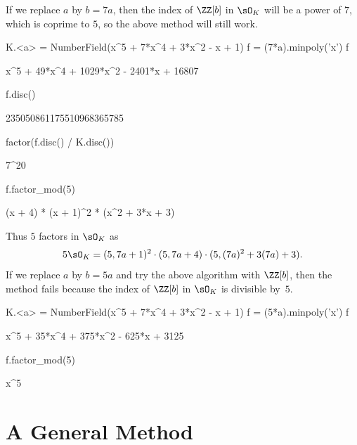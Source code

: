 If we replace $a$ by $b = 7a$, then the index of $\ZZ[b]$
in $\sO_K$ will be a power of $7$, which is coprime to $5$,
so the above method will still work.
\begin{sagecode}
\begin{sagecell}
K.<a> = NumberField(x^5 + 7*x^4 + 3*x^2 - x + 1)
f = (7*a).minpoly('x')
f
\end{sagecell}
\begin{sageout}
x^5 + 49*x^4 + 1029*x^2 - 2401*x + 16807
\end{sageout}
\begin{sagecell}
f.disc()
\end{sagecell}
\begin{sageout}
235050861175510968365785
\end{sageout}
\begin{sagecell}
factor(f.disc() / K.disc())
\end{sagecell}
\begin{sageout}
7^20
\end{sageout}
\begin{sagecell}
f.factor_mod(5)
\end{sagecell}
\begin{sageout}
(x + 4) * (x + 1)^2 * (x^2 + 3*x + 3)
\end{sageout}
\end{sagecode}
Thus $5$ factors in $\sO_K$
as
$$
  5\sO_K = (5, 7a+1)^2 \cdot (5, 7a+4) \cdot (5, (7a)^2 + 3(7a) + 3).
$$
If we replace $a$ by $b=5a$ and try the above algorithm with $\ZZ[b]$, then
the method fails because the index of $\ZZ[b]$ in $\sO_K$ is divisible by~$5$.
\begin{sagecode}
\begin{sagecell}
K.<a> = NumberField(x^5 + 7*x^4 + 3*x^2 - x + 1)
f = (5*a).minpoly('x')
f
\end{sagecell}
\begin{sageout}
x^5 + 35*x^4 + 375*x^2 - 625*x + 3125
\end{sageout}
\begin{sagecell}
f.factor_mod(5)
\end{sagecell}
\begin{sageout}
x^5
\end{sageout}
\end{sagecode}

\section{A General Method}


